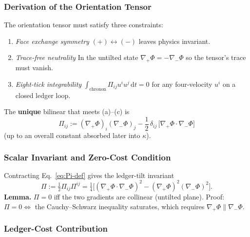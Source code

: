 \documentclass[11pt,oneside]{book}
\begin{document}
\subsubsection{Derivation of the Orientation Tensor}
\label{ss:Pi-derivation}

The orientation tensor must satisfy three constraints:

\begin{enumerate}[label=(\alph*),leftmargin=*]
\item \emph{Face exchange symmetry}  
      $(+)\leftrightarrow(-)$ leaves physics invariant.
\item \emph{Trace-free neutrality}  
      In the untilted state $\nabla_{+}\Phi=-\nabla_{-}\Phi$ so the
      tensor’s trace must vanish.
\item \emph{Eight-tick integrability}  
      $\displaystyle
      \int_{\text{chronon}}\!\Pi_{ij}u^{i}u^{j}\,\mathrm dt = 0$
      for any four-velocity $u^{i}$ on a closed ledger loop.
\end{enumerate}

The \textbf{unique} bilinear that meets (a)–(c) is
\begin{equation}
   \boxed{\;
      \Pi_{ij}
      := (\nabla_{+}\Phi)_{i}(\nabla_{-}\Phi)_{j}
         -\frac12\,\delta_{ij}\,
           \bigl[\nabla_{+}\Phi\!\cdot\!\nabla_{-}\Phi\bigr]
      \;}
   \label{eq:Pi-def}
\end{equation}
(up to an overall constant absorbed later into $\kappa$).

\subsubsection{Scalar Invariant and Zero-Cost Condition}
\label{ss:Pi-scalar}

Contracting Eq.~\eqref{eq:Pi-def} gives the ledger-tilt invariant
\[
   \Pi
   := \tfrac12\Pi_{ij}\Pi^{ij}
   = \tfrac14
     \bigl[
        (\nabla_{+}\Phi\!\cdot\!\nabla_{-}\Phi)^{2}
        - (\nabla_{+}\Phi)^{2}(\nabla_{-}\Phi)^{2}
       \bigr].
   \tag{3}
\]
\textbf{Lemma.}  
$\Pi=0$ iff the two gradients are collinear (untilted plane).  
Proof: $\Pi=0\!\iff$ the Cauchy–Schwarz inequality saturates, which
requires $\nabla_{+}\Phi \parallel \nabla_{-}\Phi$.

\subsubsection{Ledger-Cost Contribution}
\label{ss:Pi-cost-term}
\end{document}
